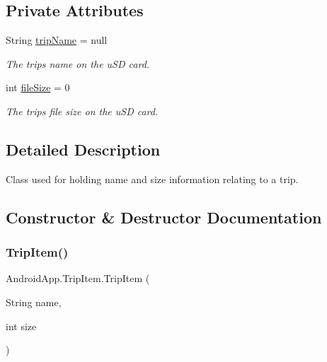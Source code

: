 \subsection*{Private Attributes}
\begin{DoxyCompactItemize}
\item 
\mbox{\label{class_android_app_1_1_trip_item_ae5137b0b6077e3fcf293430bc9c488e3}} 
String \hyperlink{class_android_app_1_1_trip_item_ae5137b0b6077e3fcf293430bc9c488e3}{trip\+Name} = null
\begin{DoxyCompactList}\small\item\em The trips name on the u\+SD card. \end{DoxyCompactList}\item 
\mbox{\label{class_android_app_1_1_trip_item_a0689a1340427784d8658cc616da310f2}} 
int \hyperlink{class_android_app_1_1_trip_item_a0689a1340427784d8658cc616da310f2}{file\+Size} = 0
\begin{DoxyCompactList}\small\item\em The trips file size on the u\+SD card. \end{DoxyCompactList}\end{DoxyCompactItemize}


\subsection{Detailed Description}
Class used for holding name and size information relating to a trip. 

\subsection{Constructor \& Destructor Documentation}
\mbox{\label{class_android_app_1_1_trip_item_a3ef9684be0d75a972fc373db43aa0efd}} 
\subsubsection{\texorpdfstring{Trip\+Item()}{TripItem()}}
{\footnotesize\ttfamily Android\+App.\+Trip\+Item.\+Trip\+Item (\begin{DoxyParamCaption}\item[{String}]{name,  }\item[{int}]{size }\end{DoxyParamCaption})\hspace{0.3cm}{\ttfamily [inline]}}



